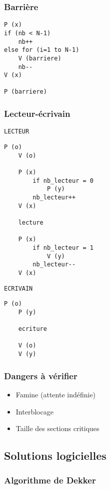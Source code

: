\documentclass[10pt,twocolumn,a4paper]{article}
\begin{document}
\subsubsection{Barrière}

\begin{lstlisting}[xleftmargin=1cm,frame=shadowbox]
P (x)
if (nb < N-1)
    nb++
else for (i=1 to N-1) 
    V (barriere)
    nb--
V (x)

P (barriere)
\end{lstlisting}

\subsubsection{Lecteur-\'ecrivain}

\texttt{LECTEUR}
\begin{lstlisting}[frame=shadowbox,xrightmargin=1cm]
    P (o)
    V (o)

    P (x)
        if nb_lecteur = 0
            P (y)
        nb_lecteur++
    V (x)

    lecture

    P (x)
        if nb_lecteur = 1
            V (y)
        nb_lecteur--
    V (x)
\end{lstlisting}

\texttt{ECRIVAIN}
\begin{lstlisting}[frame=shadowbox,xrightmargin=1cm]
    P (o)
    P (y)

    ecriture

    V (o)
    V (y)
\end{lstlisting}

\subsubsection{Dangers à vérifier}

\begin{itemize}
    \item Famine (attente indéfinie)
    \item Interblocage
    \item Taille des sections critiques
\end{itemize}

\subsection{Solutions logicielles}

\subsubsection{Algorithme de Dekker}
\end{document}
